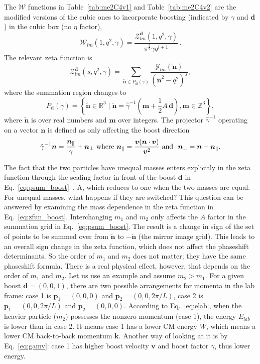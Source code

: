 \documentclass[aps,prd,reprint,showpacs,floatfix,longbibliography,,superscriptaddress]{revtex4-1}
\def\mw{\mathcal{W}}
\def\reals{\mathds{R}}
\def\beq{\begin{equation}}
\def\eeq{\end{equation}}
\begin{document}
\begin{widetext}
The $\mw$ functions in Table~\ref{tab:me2C4v1} and Table~\ref{tab:me2C4v2} are the modified versions 
of the cubic ones to incorporate boosting (indicated by $\gamma$ and $\bm d$) in the cubic box (no $\eta$ factor),
\beq
\mw_{lm}(1,q^2,\gamma)= \frac{\mathcal{Z}^{\bm d}_{lm}(1,q^2,\gamma)}{\pi^{\frac{3}{2}}\gamma q^{l+1}}\,.
\label{eq:wfun_boost}
\eeq
The relevant zeta function is
\beq
\mathcal{Z}_{lm}^{\bm d}(s,q^2,\gamma) = \sum_{ \widetilde{\bm n}\in P_{\bm d}(\gamma)} \frac{\mathcal{Y}_{lm}(\widetilde{\bm n})}{(\widetilde{\bm n}^2-q^2)^s},
\label{eq:zfun_boost}
\eeq
where the summation region changes to
\beq
P_{\bm d}(\gamma) =\left\{\widetilde{\bm n}\in\reals^3 \mid \widetilde{\bm n}=\hat{\gamma}^{-1}(\bm m+\frac{1}{2}A\, \bm d), \bm m\in \mathds{Z}^3 \right\},
\label{eq:psum_boost}
\eeq
where $\widetilde{\bm n}$ is over real numbers and $\bm m$ over integers.
The projector $\hat{\gamma}^{-1}$ operating on a vector $\bm n$ is defined as only affecting the boost direction
\beq
\hat{\gamma}^{-1} \bm n = {\bm n_{\parallel}\over \gamma} +\bm n_{\perp}
\text{  where  } \bm n_{\parallel} = {\bm v(\bm n\cdot\bm v) \over \bm v^2}   
\text{  and  }\ \bm n_{\perp}=\bm n - \bm n_{\parallel}.
\label{eq:gamma}
\eeq

The fact that the two particles have unequal masses enters explicitly in the zeta function through the scaling factor in front of the boost $\bm d$ in Eq.~\ref{eq:psum_boost}~\cite{Gockeler:2012yj,Leskovec:2012gb}, A, which reduces to one when the two masses are equal. 
For unequal masses, what happens if they are switched? 
This question can be answered by examining the mass dependence in the zeta function 
in Eq.~\ref{eq:zfun_boost}. 
Interchanging $m_1$ and $m_2$ only affects the $A$ factor in the summation grid in  Eq.~\ref{eq:psum_boost}. 
The result is a change in sign of the set of points to be summed over from $\widetilde{\bm n}$ to $- \widetilde{\bm n}$ (the mirror image grid).  
This leads to an overall sign change in the zeta function, which does not affect the phaseshift determinants. 
So the order of $m_1$ and $m_2$ does not matter; they have the same phaseshift formula.
There is a real physical effect, however,  that depends on the order of $m_1$ and $m_2$.
Let us use an example and assume $m_2 > m_1$.
For a given boost $\bm d=(0,0,1)$, 
there are two possible arrangements for momenta in the lab frame:
case 1 is $\bm p_1=(0,0,0)$ and  $\bm p_2=(0,0,2\pi/L)$, case 2 is $\bm p_1=(0,0,2\pi/L)$ and $\bm p_2=(0,0,0)$. According to Eq.~\ref{eq:elab}, when the heavier particle ($m_2$) possesses the nonzero momentum (case 1), the energy $E_{lab}$ is  lower than in case 2. 
It means case 1 has a lower CM energy $W$, which means a lower CM back-to-back momentum $\bm k$.
Another way of looking at it is by Eq.~\ref{eq:gamv}: case 1 has higher boost velocity $\bm v$ and boost factor $\gamma$, thus lower energy.


\end{widetext}
\end{document}

